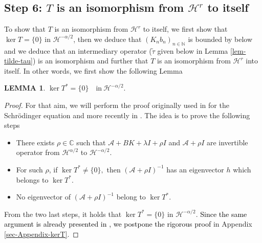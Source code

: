 \documentclass[11pt, dvipsnames]{amsart}
\newtheorem{lem}[theorem]{LEMMA}
\begin{document}
\subsection{Step 6: $T$ is an isomorphism from $\mathcal{H}^{r}$ to itself}
\label{sec:step6}
 To show that $T$ is an isomorphism from $\mathcal{H}^{r}$ to itself, we first show that $\ker T=\{0\}$ in $\mathcal{H}^{-\alpha/2}$, then we deduce that $(K_{n}b_n)_{n\in\mathbb{N}}$ is bounded by below and we deduce that an intermediary operator ($\tilde{\tau}$ given below in Lemma \ref{lem-tilde-tau}) is an isomorphism and further that $T$ is an isomorphism from $\mathcal{H}^{r}$ into itself. In other words, we first show the following Lemma
\begin{lem}\label{ker T}
    $\ker T^*=\{0\}\quad \text{in} \ \mathcal{H}^{-\alpha/2}.$
\end{lem}
\begin{proof}
For that aim, we will perform the proof originally used in \cite{Coron2018-rapid} for the Schrödinger equation and more recently in \cite{Gagnon2022-fredholm-laplacien,Gagnon2022-fredholm}. The idea is to prove the following steps 
\begin{itemize}
    \item There exists $\rho\in \mathbb{C}$ such that $\mathcal{A}+BK+\lambda I+\rho I$ and $\mathcal{A}+\rho I$ are invertible operator from $\mathcal{H}^{\alpha/2}$ to $\mathcal{H}^{-\alpha/2}.$
    \item For such $\rho$, if $\ker T^*\neq \{0\},$ then $(\mathcal{A}+\rho I)^{-1}$ has an eigenvector $h$ which belongs to $\ker T^*.$
    \item No eigenvector of $(\mathcal{A}+\rho I)^{-1}$ belong to $\ker T^*.$
\end{itemize}
From the two last steps, it holds that $\ker T^*=\{0\}$ in $\mathcal{H}^{-\alpha/2}.$ \textcolor{black}{Since the same argument is already presented in \cite{Coron2018-rapid,Gagnon2022-fredholm-laplacien,Gagnon2022-fredholm}, we postpone the rigorous proof} in Appendix \ref{sec-Appendix-kerT}.
\end{proof}
\end{document}
